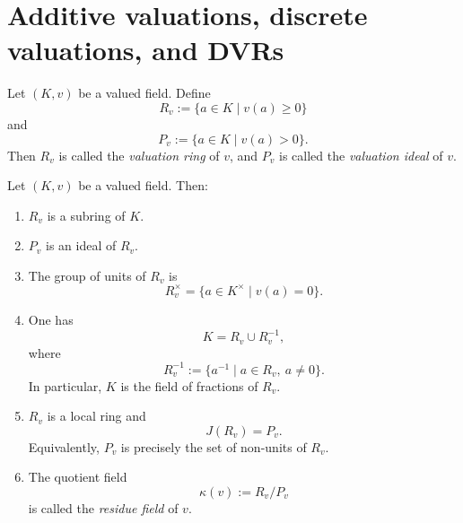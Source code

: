\section{Additive valuations, discrete valuations, and DVRs}

\begin{definition}
Let \((K,v)\) be a valued field. Define
\[
    R_v := \{a\in K \mid v(a)\geq 0\}
\]
and
\[
    P_v := \{a\in K \mid v(a)>0\}.
\]
Then \(R_v\) is called the \emph{valuation ring} of \(v\), and \(P_v\) is called the
\emph{valuation ideal} of \(v\).
\end{definition}

\begin{proposition}
Let \((K,v)\) be a valued field. Then:
\begin{enumerate}
    \item \(R_v\) is a subring of \(K\).
    \item \(P_v\) is an ideal of \(R_v\).
    \item The group of units of \(R_v\) is
    \[
        R_v^\times=\{a\in K^\times \mid v(a)=0\}.
    \]
    \item One has
    \[
        K=R_v\cup R_v^{-1},
    \]
    where
    \[
        R_v^{-1}:=\{a^{-1}\mid a\in R_v,\ a\neq 0\}.
    \]
    In particular, \(K\) is the field of fractions of \(R_v\).
    \item \(R_v\) is a local ring and
    \[
        J(R_v)=P_v.
    \]
    Equivalently, \(P_v\) is precisely the set of non-units of \(R_v\).
    \item The quotient field
    \[
        \kappa(v):=R_v/P_v
    \]
    is called the \emph{residue field} of \(v\).
\end{enumerate}
\end{proposition}

